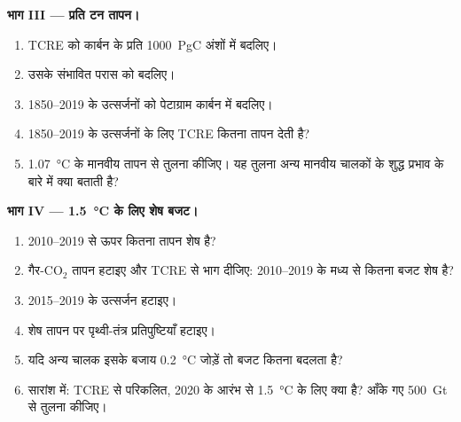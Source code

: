 \begin{problem}
\noindent\textbf{भाग III --- प्रति टन तापन।}
\begin{enumerate}[resume]
  \item TCRE को कार्बन के प्रति \qty{1000}{PgC} अंशों में बदलिए।
  \item उसके संभावित परास को बदलिए।
  \item 1850--2019 के उत्सर्जनों को पेटाग्राम कार्बन में बदलिए।
  \item 1850--2019 के उत्सर्जनों के लिए TCRE कितना तापन देती है?
  \item \qty{1.07}{\celsius} के मानवीय तापन से तुलना कीजिए। यह तुलना अन्य मानवीय चालकों के
        शुद्ध प्रभाव के बारे में क्या बताती है?
\end{enumerate}

\noindent\textbf{भाग IV --- \qty{1.5}{\celsius} के लिए शेष बजट।}
\begin{enumerate}[resume]
  \item 2010--2019 से ऊपर कितना तापन शेष है?
  \item गैर-CO$_2$ तापन हटाइए और TCRE से भाग दीजिए: 2010--2019 के मध्य से कितना बजट
        शेष है?
  \item 2015--2019 के उत्सर्जन हटाइए।
  \item शेष तापन पर पृथ्वी-तंत्र प्रतिपुष्टियाँ हटाइए।
  \item यदि अन्य चालक इसके बजाय \qty{0.2}{\celsius} जोड़ें तो बजट कितना बदलता है?
  \item सारांश में: TCRE से परिकलित, 2020 के आरंभ से \qty{1.5}{\celsius} के लिए 
        क्या है? आँके गए \qty{500}{Gt} से तुलना कीजिए।
\end{enumerate}
\end{problem}

